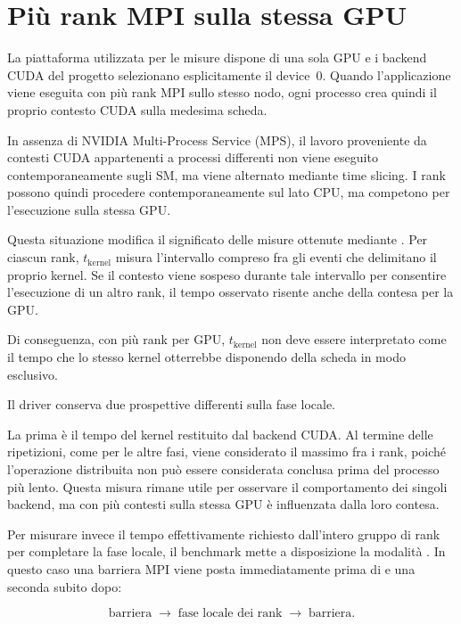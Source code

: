 \section{Più rank MPI sulla stessa GPU}
\label{sec:serializzazione}

La piattaforma utilizzata per le misure dispone di una sola GPU e i backend
CUDA del progetto selezionano esplicitamente il device~0. Quando
l'applicazione viene eseguita con più rank MPI sullo stesso nodo, ogni
processo crea quindi il proprio contesto CUDA sulla medesima scheda.

In assenza di NVIDIA Multi-Process Service (MPS), il lavoro proveniente da
contesti CUDA appartenenti a processi differenti non viene eseguito
contemporaneamente sugli SM, ma viene alternato mediante time slicing.
I rank possono quindi procedere contemporaneamente sul lato CPU, ma
competono per l'esecuzione sulla stessa GPU.

Questa situazione modifica il significato delle misure ottenute mediante
. Per ciascun rank, $t_{\mathrm{kernel}}$ misura
l'intervallo compreso fra gli eventi che delimitano il proprio kernel.
Se il contesto viene sospeso durante tale intervallo per consentire
l'esecuzione di un altro rank, il tempo osservato risente anche della
contesa per la GPU.

Di conseguenza, con più rank per GPU, $t_{\mathrm{kernel}}$ non deve essere
interpretato come il tempo che lo stesso kernel otterrebbe disponendo della
scheda in modo esclusivo.

Il driver conserva due prospettive differenti sulla fase locale.

La prima è il tempo del kernel restituito dal backend CUDA. Al termine
delle ripetizioni, come per le altre fasi, viene considerato il massimo
fra i rank, poiché l'operazione distribuita non può essere considerata
conclusa prima del processo più lento. Questa misura rimane utile per
osservare il comportamento dei singoli backend, ma con più contesti sulla
stessa GPU è influenzata dalla loro contesa.

Per misurare invece il tempo effettivamente richiesto dall'intero gruppo
di rank per completare la fase locale, il benchmark mette a disposizione
la modalità . In questo caso una barriera MPI viene
posta immediatamente prima di  e una seconda subito dopo:

\[
\text{barriera}
\;\longrightarrow\;
\text{fase locale dei rank}
\;\longrightarrow\;
\text{barriera}.
\]

